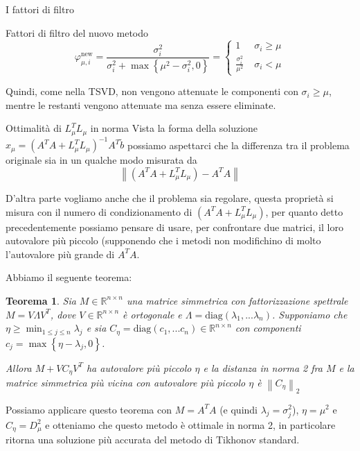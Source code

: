 \documentclass{beamer}
\newcounter{counter1}
\theoremstyle{plain}
\newtheorem{myteo}[counter1]{Teorema}
\theoremstyle{definition}
\theoremstyle{remark}
\newcommand{\set}[1]{\left\{#1\right\}}
\newcommand{\pa}[1]{\left(#1\right)}
\newcommand{\norm}[1]{\left\|#1\right\|}
\begin{document}
\begin{frame}{I fattori di filtro}
  \begin{block}{Fattori di filtro del nuovo metodo}
    \[ \varphi ^{\text{new}} _{\mu,i} = \frac{\sigma _i ^2}{\sigma _i ^2 + \max\set{
        \mu ^2 - \sigma _i ^2 ,0}  } = \left\{
      \begin{matrix}
        1\; & \sigma _i \ge \mu \\
        \frac{\sigma _i ^2}{\mu ^2} \; & \sigma _i < \mu
      \end{matrix}
    \right. \]
  \end{block}
  \vfill
  
  Quindi, come nella TSVD, non vengono attenuate le componenti con
  $\sigma _i \ge \mu$, mentre le restanti vengono attenuate ma senza
  essere eliminate.
\end{frame}

\begin{frame}{Ottimalità di $L_\mu ^T L_\mu$ in norma}
  Vista la forma della soluzione $x_\mu = \pa{ A^T A + L_\mu^T L_\mu
  }^{-1} A^T \tilde b$ possiamo aspettarci che la differenza tra il
  problema originale sia in un qualche modo misurata da 
  \[ \norm{ \pa{ A^T A + L_\mu^T L_\mu } - A^T A } \]
  
  D'altra parte vogliamo anche che il problema sia regolare, questa
  proprietà si misura con il numero di condizionamento di $\pa{ A^T A
    + L_\mu^T L_\mu }$, per quanto detto precedentemente possiamo
  pensare di usare, per confrontare due matrici, il loro autovalore
  più piccolo (supponendo che i metodi non modifichino di molto
  l'autovalore più grande di $A^T A$.
\end{frame}

\begin{frame}
  Abbiamo il seguente teorema:
  \begin{myteo}
    Sia $M \in \mathbb{R}^{n\times n}$ una matrice simmetrica con
    fattorizzazione spettrale $M = V \Lambda V^T$, dove $V \in
    \mathbb{R}^{n \times n}$ è ortogonale e  $\Lambda = \mathrm{diag} \pa{
      \lambda _1, ... \lambda _n}$. Supponiamo che  $\eta \ge \min _{1\le
      j\le n} \lambda _j$ e sia $C_\eta = \mathrm{diag}
    \pa{ c_1 , ... c_n}\in \mathbb{R}^{n\times n}$ con componenti $c_j
    = \max \set{\eta - \lambda _j, 0}$.
    
    Allora $M + V C_\eta V^T$ ha autovalore più piccolo $\eta$
    e la distanza in norma 2 fra $M$ e la matrice simmetrica più vicina
    con autovalore più piccolo $\eta$ è $\norm{ C_\eta }_2$
  \end{myteo}
  
  Possiamo applicare questo teorema con $M = A^T A$ (e quindi $\lambda
  _j = \sigma _j ^2$), $\eta = \mu ^2$ e $C_\eta = D_\mu ^2$
  e otteniamo che questo metodo è ottimale in norma 2, in particolare
  ritorna una soluzione più accurata del metodo di Tikhonov standard.
\end{frame}
\end{document}
